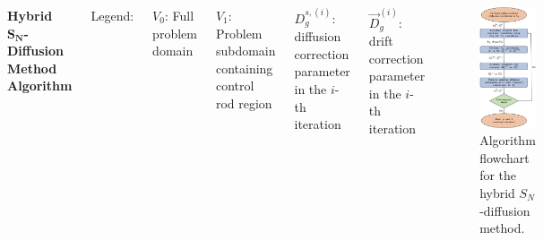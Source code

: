 \begin{frame}
  \begin{columns}
    \vspace{1cm}

  {\small
    \textbf{Hybrid $\bm{S_N}$-Diffusion Method Algorithm}
    \vspace{.2cm}

    Legend:
    \vspace{.1cm}

  $V_0$: Full problem domain
  \vspace{.1cm}

  $V_1$: Problem subdomain containing control rod region
  \vspace{.1cm}

  $D^{s,(i)}_g$: diffusion correction parameter in the $i$-th iteration
  \vspace{.1cm}

  $\vec{D}^{(i)}_g$: drift correction parameter in the $i$-th iteration
\vspace{4cm}}
  \begin{figure}
    \centering
    \includegraphics[width=.53\textwidth]{images/algorithm}
    \begin{minipage}[b]{.49\textwidth}
      \caption{Algorithm flowchart for the hybrid $S_N$-diffusion method.}
    \end{minipage}
  \end{figure}
\end{columns}
\end{frame}

